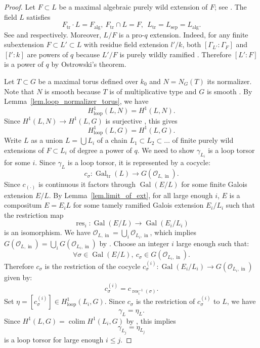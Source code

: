 \documentclass[12pt]{amsart}
\numberwithin{equation}{section}
\theoremstyle{definition}
\newcommand{\cO}{\mathcal{O}}
\newcommand{\Gal}{\operatorname{Gal}}
\newcommand{\alg}{\operatorname{alg}}
\newcommand{\sep}{\operatorname{sep}}
\newcommand{\colim}{\operatorname{colim}}
\newcommand{\tr}{\operatorname{tr}}
\newcommand{\res}{\operatorname{res}}
\newcommand{\Ftr}{F_{\tr}}
\newcommand{\Ltr}{L_{\tr}}
\newcommand{\Falg}{F_{\alg}}
\newcommand{\oin}{\operatorname{in}}
\newcommand{\Galtr}{\Gal_{\tr}}
\newcommand{\lop}{\operatorname{loop}}
\begin{document}
\begin{proof}
    Let $F\subset L$ be a maximal algebraic purely wild extension of $F$; see \cite[Section 4]{kuhlmann1986immediate}. The field $L$ satisfies 
    $$\Ftr \cdot L = \Falg,\  \Ftr\cap L = F, \ \ \Ltr = L_{\sep}=L_{\alg}.$$
    See \cite[Theorem 4.3]{kuhlmann1986immediate} and  \cite[Lemma 6.3]{kuhlmann1986immediate} respectively. Moreover, $L/F$ is a pro-$q$ extension. Indeed, for any finite subextension $F\subset L'\subset L$ with residue field extension $l'/k$, both $[\Gamma_{L'}:\Gamma_F]$ and $[l':k]$ are powers of $q$ because $L'/F$ is purely wildly ramified \cite[Section 4]{kuhlmann1986immediate}. Therefore $[L':F]$ is a power of $q$ by Ostrowski's theorem.  
    
    Let $T\subset G$ be a maximal torus defined over $k_0$ and $N = N_G(T)$ its normalizer. Note that $N$ is smooth because $T$ is of multiplicative type and $G$ is smooth \cite[Expose XI, Corollaire 2.4]{SGA3}. By Lemma~\ref{lem.loop_normalizer_torus}, we have $$H^1_{\lop}(L,N)=H^1(L,N).$$ 
    Since $H^1(L,N) \to H^1(L,G)$ is surjective \cite[Corollary 5.3]{chernousov2008reduction}, this gives $$H^1_{\lop}(L,G)=H^1(L,G).$$
    Write $L$ as a union $L= \bigcup L_i$ of a chain $L_1\subset L_2 \subset \dots $ of finite purely wild extensions of $F\subset L_i$ of degree a power of $q$. We need to show $\gamma_{L_i}$ is a loop torsor for some $i$. Since $\gamma_L$ is a loop torsor, it is represented by a cocycle:
    $$c_\sigma : \Galtr(L)\to G(\cO_{L,\oin}).$$
    Since $c_{(\cdot)}$ is continuous it factors through $\Gal(E/L)$ for some finite Galois extension $E/L$. By Lemma~\ref{lem.limit_of_ext}, for all large enough $i$, $E$ is a compositum $E= E_i L$ for some tamely ramified Galois extension $E_i/L_i$ such that the restriction map $$\res_i: \Gal(E/L)\to \Gal(E_i/L_i)$$ is an isomorphism. We have $\cO_{L,\oin} = \bigcup_i \cO_{L_i,\oin}$, which implies  $G(\cO_{L,\oin}) =\bigcup_i G(\cO_{L_i,\oin})$ by \cite[Lemma 10.62]{gortz2010algebraic}. Choose an integer $i$ large enough such that: $$\forall\sigma\in \Gal(E/L), \  c_\sigma \in G(\cO_{L_i,\oin}).$$ 
    Therefore $c_\sigma$ is the restriction of the cocycle $c^{(i)}_\sigma: \Gal(E_i/L_i) \to  G(\cO_{L_i,\oin})$ given by:
    $$c^{(i)}_\sigma = c_{\res_i^{-1}(\sigma)}.$$
    Set $\eta = [c^{(i)}_\sigma]\in H^1_{\lop}(L_i,G)$.  Since $c_\sigma$ is the restriction of $c^{(i)}_\sigma$ to $L$, we have $$ \gamma_L=\eta_L .$$ 
Since $H^1(L,G) = \colim H^1(L_i,G)$ by \cite[Theorem 2.1]{margaux2007passage}, this implies $$\gamma_{L_j} =\eta_{L_j}$$
 is a loop torsor for large enough $i \leq j$. 
\end{proof}
\end{document}
